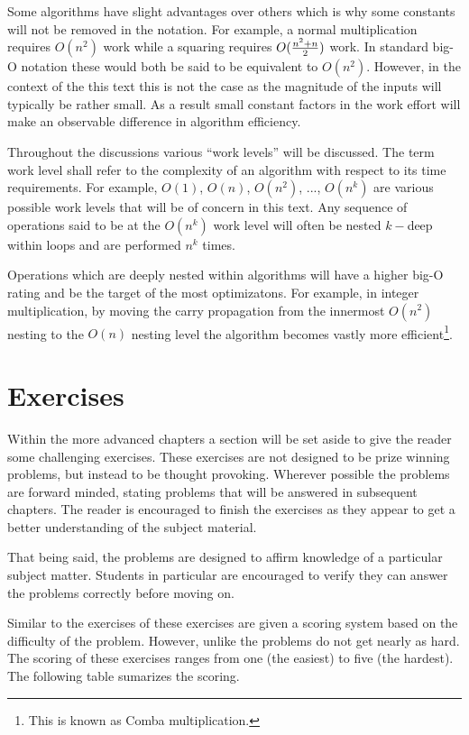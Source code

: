 \documentclass[b5paper]{book}
\begin{document}
Some algorithms have slight advantages over others which is why some constants will not be removed in 
the notation.  For example, a normal multiplication requires $O(n^2)$ work while a squaring requires 
$O({{n^2 + n}\over 2})$ work.  In standard big-O notation these would both be said to be equivalent to $O(n^2)$.  However, 
in the context of the this text this is not the case as the magnitude of the inputs will typically be rather small.  As a 
result small constant factors in the work effort will make an observable difference in algorithm efficiency.

Throughout the discussions various ``work levels'' will be discussed.  The term work level shall refer to 
the complexity of an algorithm with respect to its time requirements.  For example, 
$O(1)$, $O(n)$, $O(n^2)$, ..., $O(n^k)$ are various possible work levels that will be of concern in this text.  Any 
sequence of operations said to be at the $O(n^k)$ work level will often be nested $k-$deep within loops and are performed
$n^k$ times.

Operations which are deeply nested within algorithms will have a higher big-O rating and be the target of the most 
optimizatons.  For example, in integer multiplication, by moving the carry propagation from the innermost 
$O(n^2)$ nesting to the $O(n)$ nesting level the algorithm becomes vastly more 
efficient\footnote{This is known as Comba multiplication.}.  

\section{Exercises}
Within the more advanced chapters a section will be set aside to give the reader some challenging exercises.  These 
exercises are not designed to be prize winning problems, but instead to be thought provoking.  Wherever possible the 
problems are forward minded, stating problems that will be answered in subsequent chapters.  The reader is encouraged to 
finish the exercises as they appear to get a better understanding of the subject material.  

That being said, the problems are designed to affirm knowledge of a particular subject matter.  Students in particular
are encouraged to verify they can answer the problems correctly before moving on.

Similar to the exercises of \cite[pp. ix]{TAOCPV2} these exercises are given a scoring system based on the difficulty of
the problem.  However, unlike \cite{TAOCPV2} the problems do not get nearly as hard.  The scoring of these 
exercises ranges from one (the easiest) to five (the hardest).  The following table sumarizes the 
scoring.
\end{document}

